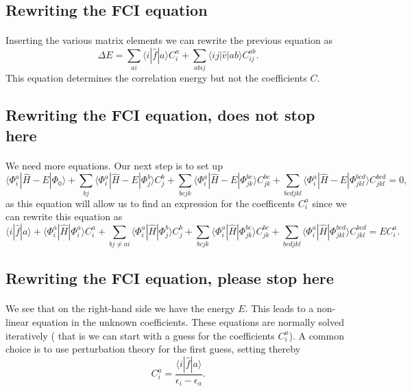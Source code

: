 \documentclass[%
oneside,                 %
final,                   %
10pt]{article}
\begin{document}
\subsection*{Rewriting the FCI equation}

\paragraph{}
Inserting the various matrix elements we can rewrite the previous equation as
\[
\Delta E=\sum_{ai}\langle i| \hat{f}|a \rangle C_{i}^{a}+
\sum_{abij}\langle ij | \hat{v}| ab \rangle C_{ij}^{ab}.
\]
This equation determines the correlation energy but not the coefficients $C$.



\subsection*{Rewriting the FCI equation, does not stop here}

\paragraph{}
We need more equations. Our next step is to set up
\[
\langle \Phi_i^a | \hat{H} -E| \Phi_0\rangle + \sum_{bj}\langle \Phi_i^a | \hat{H} -E|\Phi_{j}^{b} \rangle C_{j}^{b}+
\sum_{bcjk}\langle \Phi_i^a | \hat{H} -E|\Phi_{jk}^{bc} \rangle C_{jk}^{bc}+
\sum_{bcdjkl}\langle \Phi_i^a | \hat{H} -E|\Phi_{jkl}^{bcd} \rangle C_{jkl}^{bcd}=0,
\]
as this equation will allow us to find an expression for the coefficents $C_i^a$ since we can rewrite this equation as 
\[
\langle i | \hat{f}| a\rangle +\langle \Phi_i^a | \hat{H}|\Phi_{i}^{a} \rangle C_{i}^{a}+ \sum_{bj\ne ai}\langle \Phi_i^a | \hat{H}|\Phi_{j}^{b} \rangle C_{j}^{b}+
\sum_{bcjk}\langle \Phi_i^a | \hat{H}|\Phi_{jk}^{bc} \rangle C_{jk}^{bc}+
\sum_{bcdjkl}\langle \Phi_i^a | \hat{H}|\Phi_{jkl}^{bcd} \rangle C_{jkl}^{bcd}=EC_i^a.
\]



\subsection*{Rewriting the FCI equation, please stop here}

\paragraph{}
We see that on the right-hand side we have the energy $E$. This leads to a non-linear equation in the unknown coefficients. 
These equations are normally solved iteratively ( that is we can start with a guess for the coefficients $C_i^a$). A common choice is to use perturbation theory for the first guess, setting thereby
\[
 C_{i}^{a}=\frac{\langle i | \hat{f}| a\rangle}{\epsilon_i-\epsilon_a}.
\]
\end{document}
